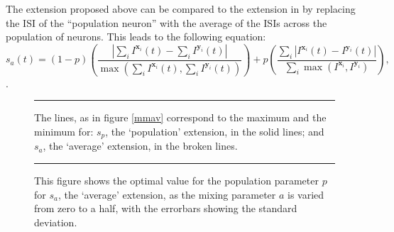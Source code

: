 %

The extension proposed above can be compared to the extension in \citep{KreuzEtAl2009a} by replacing the ISI of the ``population neuron'' with the average of the ISIs across the population of neurons.  This leads to the following equation: 
\begin{equation}
\label{av}
s_a(t) = (1-p) \left(\frac{ | \sum_i I^{\mathbf{x}_i}(t) - \sum_i I^{\mathbf{y}_i}(t) |}{\max (\sum_i I^{\mathbf{x}_i}(t),\sum_i I^{\mathbf{y}_i}(t) )}\right) + p\left( \frac{\sum_i | I^{\mathbf{x}_i}(t) - I^{\mathbf{y}_i}(t) |}{\sum_i \max (I^{\mathbf{x}_i},I^{\mathbf{y}_i})} \right),
\end{equation}.


\begin{figure}[htb]

\bigskip
\rule{35em}{0.5pt}
\caption{The lines, as in figure \ref{mmav} correspond to the maximum and the minimum for: $s_p$, the \lq{}population\rq{} extension, in the solid lines; and $s_a$, the \lq{}average\rq{} extension, in the broken lines.}
\end{figure}

\begin{figure}[htb]

\bigskip
\rule{35em}{0.5pt}
\caption{This figure shows the optimal value for the population parameter $p$ for $s_a$, the \lq{}average\rq{} extension, as the mixing parameter $a$ is varied from zero to a half, with the errorbars showing the standard deviation.}
\end{figure}

